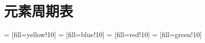 \setlength{\defaultTopMargin}{\topmargin}

\section{元素周期表}
\setlength{\topmargin}{-1in}

\newcommand{\NaturalElementTextFormat}[8]
{
	\begin{minipage}{2.21cm}
		\centering
		{\textbf{#1}\hfill \underline{{#7}} \hfill {#2}\textit{{#3}}}%
		\\[0.1cm]
		{\LARGE \textbf{{#5} {#8}}}
		\linebreak
		{\fontsize{8}{8}\selectfont {#6} }
		\linebreak
		{\tiny {#4}} 
	\end{minipage}
}

 = [fill=yellow!10]
 = [fill=blue!10]
 = [fill=red!10]
 = [fill=green!10]

